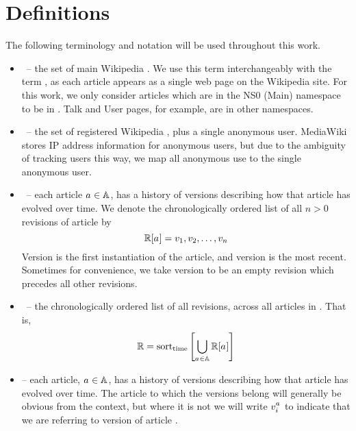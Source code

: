 
\chapter{Definitions}
\label{ch:defs}

The following terminology and notation
will be used throughout this work.

\renewcommand{\labelitemi}{}
\begin{itemize}
\item \articles \ -- the set of main Wikipedia .
    We use this term interchangeably with the term ,
    as each article appears as a single web page on the Wikipedia site.
    For this work, we only consider articles which are in
    the NS0 (Main) namespace to be in \articles.
    Talk and User pages, for example, are in other namespaces.
\item \users \ -- the set of registered Wikipedia ,
    plus a single anonymous user.
    MediaWiki stores IP address information for anonymous users,
    but due to the ambiguity of tracking users this way,
    we map all anonymous use to the single anonymous user.
\item \revisions{\article{}} \ -- each article $a_{} \in \mathbb{A}$,
    has a history of versions
    describing how that article has evolved over time.
    We denote the chronologically ordered list
    of all $n > 0$ revisions of article \article{} by
    \begin{equation}
	\revisions{\article{}} =
		\version{1}, \version{2}, \ldots, \version{n}
    \end{equation}
    Version  is the first instantiation of the article,
    and version  is the most recent.
    Sometimes for convenience, we take version  to be
    an empty revision which precedes all other revisions.
\item \revisions{} \ -- the chronologically ordered list of all
    revisions, across all articles in \articles.
    That is,
    \begin{equation}
    \revisions{} = \mathrm{sort}_\mathrm{time}\left[
	\bigcup_{\article{} \in \articles} \revisions{\article{}}
	\right]
    \end{equation}

\item {} -- each article, $a_{} \in \mathbb{A}$,
    has a history of versions
    describing how that article has evolved over time.
    The article to which the versions belong will generally be
    obvious from the context, but where it is not we will
    write $v_{i}^{a_{}}$ to indicate that we
    are referring to version  of article \article{}.


\end{itemize}
